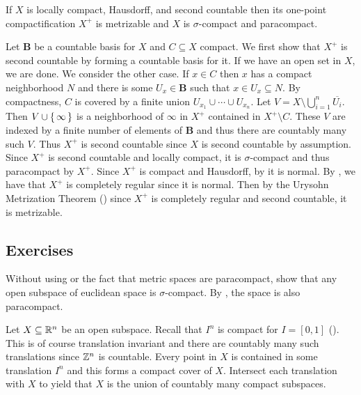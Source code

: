 \documentclass[letterpaper, 11pt, oneside]{book}
\begin{document}
\begin{thrm}
  If $X$ is locally compact, Hausdorff, and second countable then its one-point compactification $X^{+}$ is metrizable and $X$ is $\sigma$-compact and paracompact.
\end{thrm}
\begin{pf}
  Let \textbf{B} be a countable basis for $X$ and $C \subseteq X$ compact.
  We first show that $X^{+}$ is second countable by forming a countable basis for it.
  If we have an open set in $X$, we are done.
  We consider the other case.
  If $x \in C$ then $x$ has a compact neighborhood $N$ and there is some $U_{x} \in \textbf{B}$ such that $x \in U_{x} \subseteq N$.
  By compactness, $C$ is covered by a finite union $U_{x_{1}} \cup \cdots \cup U_{x_{n}}$.
  Let $V = X \setminus \bigcup_{i = 1}^{n} \overline{U_{i}}$.
  Then $V \cup \set{\infty}$ is a neighborhood of $\infty$ in $X^{+}$ contained in $X^{+} \setminus C$.
  These $V$ are indexed by a finite number of elements of \textbf{B} and thus there are countably many such $V$.
  Thus $X^{+}$ is second countable since $X$ is second countable by assumption.
  Since $X^{+}$ is second countable and locally compact, it is $\sigma$-compact and thus paracompact by  $X^{+}$.
  Since $X^{+}$ is compact and Hausdorff, by  it is normal.
  By , we have that $X^{+}$ is completely regular since it is normal.
  Then by the Urysohn Metrization Theorem () since $X^{+}$ is completely regular and second countable, it is metrizable.
\end{pf}

\clearpage

\subsection*{Exercises}

\begin{exercise}
  Without using  or the fact that metric spaces are paracompact, show that any open subspace of euclidean space is $\sigma$-compact.
  By , the space is also paracompact.
\end{exercise}
\begin{pf}
  Let $X \subseteq \mathbb{R}^{n}$ be an open subspace.
  Recall that $I^{n}$ is compact for $I = [0, 1]$ ().
  This is of course translation invariant and there are countably many such translations since $\mathbb{Z}^{n}$ is countable.
  Every point in $X$ is contained in some translation $I^{n}$ and this forms a compact cover of $X$.
  Intersect each translation with $X$ to yield that $X$ is the union of countably many compact subspaces.
\end{pf}
\end{document}

